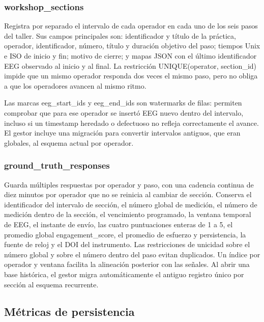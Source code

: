 \documentclass[11pt,a4paper]{article}
\begin{document}
\subsubsection{{\ttfamily\small workshop\_sections}}

Registra por separado el intervalo de cada operador en cada uno de los seis pasos del
taller. Sus campos principales son: identificador y título de la práctica, operador,
identificador, número, título y duración objetivo del paso; tiempos Unix e ISO de inicio y
fin; motivo de cierre; y mapas JSON con el último identificador EEG observado al inicio y
al final. La restricción {\ttfamily\small UNIQUE(operator, section\_id)} impide que un mismo
operador responda dos veces el mismo paso, pero no obliga a que los operadores avancen al
mismo ritmo.

Las marcas {\ttfamily\small eeg\_start\_ids} y {\ttfamily\small eeg\_end\_ids} son
watermarks de filas: permiten comprobar que para ese operador se insertó EEG nuevo dentro
del intervalo, incluso si un timestamp heredado o defectuoso no refleja correctamente el
avance. El gestor incluye una migración para convertir intervalos antiguos, que eran
globales, al esquema actual por operador.

\subsubsection{{\ttfamily\small ground\_truth\_responses}}

Guarda múltiples respuestas por operador y paso, con una cadencia continua de diez minutos
por operador que no se reinicia al cambiar de sección.
Conserva el identificador del intervalo de sección, el número global de medición, el número
de medición dentro de la sección, el vencimiento programado, la ventana temporal de EEG,
el instante de envío, las cuatro puntuaciones enteras de 1 a 5, el promedio global
{\ttfamily\small engagement\_score}, el promedio de esfuerzo y persistencia, la fuente de
reloj y el DOI del instrumento. Las restricciones de unicidad sobre el número global y
sobre el número dentro del paso evitan duplicados. Un índice por operador y ventana
facilita la alineación posterior con las señales. Al abrir una base histórica, el gestor
migra automáticamente el antiguo registro único por sección al esquema recurrente.

\subsection{Métricas de persistencia}
\end{document}
